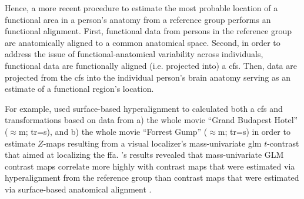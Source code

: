 


%
Hence, a more recent procedure \citep[e.g., ][]{jiahui2020predicting,
guntupalli2016model, haxby2011common} to estimate the most probable location of
a functional area in a person's anatomy from a reference group performs an
functional alignment.
First, functional data from persons in the reference group are anatomically
aligned to a common anatomical space.
%
Second, in order to address the issue of functional-anatomical variability
across individuals, functional data are functionally aligned (i.e. projected
into) a \ac{cfs}.
%
Then, data are projected from the \ac{cfs} into the individual person's brain
anatomy serving as an estimate of a functional region's location.

For example, \citet{jiahui2020predicting} used surface-based hyperalignment to
calculated both a \ac{cfs} and transformations based on data from
%
a) the whole movie ``Grand Budapest Hotel'' ($\approx$\unit[50]{m};
\ac{tr}=\unit[1]{s}), and
%
b) the whole movie ``Forrest Gump'' ($\approx$\unit[120]{m};
\ac{tr}=\unit[2]{s})
%
in order to estimate $Z$-maps resulting from a visual localizer's
mass-univariate \ac{glm} $t$-contrast that aimed at localizing the \ac{ffa}.
\citet{jiahui2020predicting}'s results revealed that mass-univariate GLM
contrast maps correlate more highly with contrast maps that were estimated via
hyperalignment from the reference group than contrast maps that were estimated
via surface-based anatomical alignment \citep{jiahui2020predicting}.




